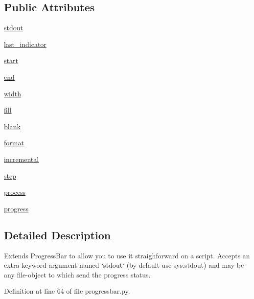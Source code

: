 \subsection*{Public Attributes}
\begin{DoxyCompactItemize}
\item 
\hyperlink{classprogressbar_1_1AnimatedProgressBar_aa4bc611ade566c28f1c54e5608a2a200}{stdout}
\item 
\hyperlink{classprogressbar_1_1AnimatedProgressBar_a50c3cb9a4b317224bd600047efb761d2}{last\+\_\+indicator}
\item 
\hyperlink{classprogressbar_1_1ProgressBar_a550afef3072c2412e2aa906b12c33bbe}{start}
\item 
\hyperlink{classprogressbar_1_1ProgressBar_a92053e3baab49364971c15373b6c848f}{end}
\item 
\hyperlink{classprogressbar_1_1ProgressBar_abde0c8da19e6e6bcde845b1eb3cee279}{width}
\item 
\hyperlink{classprogressbar_1_1ProgressBar_a6b11796a20118f92eb59abbccf626d23}{fill}
\item 
\hyperlink{classprogressbar_1_1ProgressBar_a0bfce2d34f0a8f034748d77cc5140bc5}{blank}
\item 
\hyperlink{classprogressbar_1_1ProgressBar_a4dd00a852851da809ffad5e1bf282858}{format}
\item 
\hyperlink{classprogressbar_1_1ProgressBar_a0b98b7a8f7025b78a5d01f0dcfc2dbaa}{incremental}
\item 
\hyperlink{classprogressbar_1_1ProgressBar_ac076ee00e3a70c69b8583668c165415a}{step}
\item 
\hyperlink{classprogressbar_1_1ProgressBar_a28ce54371f3a84172049c0520726d2aa}{process}
\item 
\hyperlink{classprogressbar_1_1ProgressBar_a3adc96f42e6891bcd2885c9ef29767f3}{progress}
\end{DoxyCompactItemize}


\subsection{Detailed Description}
\begin{DoxyVerb}Extends ProgressBar to allow you to use it straighforward on a script.
Accepts an extra keyword argument named `stdout` (by default use sys.stdout)
and may be any file-object to which send the progress status.
\end{DoxyVerb}
 

Definition at line 64 of file progressbar.\+py.



